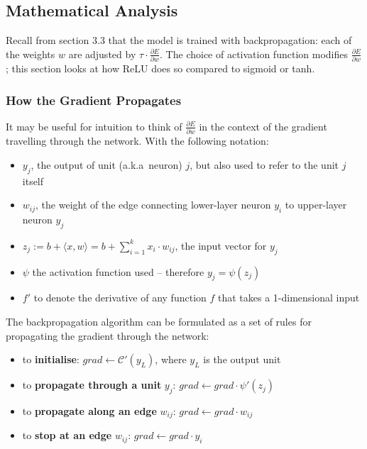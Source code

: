 \documentclass[a4paper,11pt]{article}
\begin{document}
\subsection{Mathematical Analysis}

Recall from section 3.3 that the model is trained with backpropagation: each of the weights $w$ are adjusted by $\tau \cdot \frac{\partial{E}}{\partial{w}}$. The choice of activation function modifies $\frac{\partial{E}}{\partial{w}}$; this section looks at how ReLU does so compared to sigmoid or tanh. \\

\subsubsection{How the Gradient Propagates}

It may be useful for intuition to think of $\frac{\partial{E}}{\partial{w}}$ in the context of the gradient travelling through the network. With the following notation:
\begin{itemize}
\item $y_{j}$, the output of unit (a.k.a\ neuron) $j$, but also used to refer to the unit $j$ itself
\item $w_{ij}$, the weight of the edge connecting lower-layer neuron $y_{i}$ to upper-layer neuron $y_{j}$
\item $z_{j} := b+ \langle x,w \rangle = b + \sum\limits_{i=1}^k x_{i}\cdot w_{ij}$, the input vector for $y_{j}$
\item $\psi$ the activation function used -- therefore $y_{j} = \psi(z_{j})$ 
\item $f'$ to denote the derivative of any function $f$ that takes a 1-dimensional input
\end{itemize}

The backpropagation algorithm can be formulated as a set of rules for propagating the gradient through the network:
\begin{itemize}
\renewcommand\labelitemi{--}
\item to \textbf{initialise}: $grad \leftarrow \mathcal{C}'(y_{L})$, where $y_{L}$ is the output unit
\item to \textbf{propagate through a unit} $y_{j}$: $grad \leftarrow grad \cdot \psi'(z_{j})$
\item to \textbf{propagate along an edge} $w_{ij}$: $grad \leftarrow grad \cdot w_{ij}$
\item to \textbf{stop at an edge} $w_{ij}$: $grad \leftarrow grad \cdot y_{i}$ \\
\end{itemize}
\end{document}
